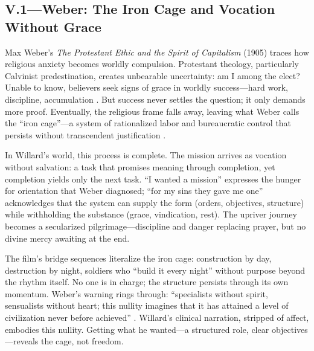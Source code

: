 \subsection*{V.1—Weber: The Iron Cage and Vocation Without Grace}
\label{ssec:v-weber}
Max Weber's \textit{The Protestant Ethic and the Spirit of Capitalism} (1905) traces how 
religious anxiety becomes worldly compulsion. Protestant theology, particularly Calvinist 
predestination, creates unbearable uncertainty: am I among the elect? Unable to know, believers 
seek signs of grace in worldly success---hard work, discipline, accumulation 
\parencite{WeberProtestant2002}. But success never settles the question; it only demands more 
proof. Eventually, the religious frame falls away, leaving what Weber calls the ``iron 
cage''---a system of rationalized labor and bureaucratic control that persists without 
transcendent justification \parencite{WeberProtestant2002}.

In Willard's world, this process is complete. The mission arrives as vocation without 
salvation: a task that promises meaning through completion, yet completion yields only the next 
task. ``I wanted a mission'' expresses the hunger for orientation that Weber diagnosed; ``for 
my sins they gave me one'' acknowledges that the system can supply the form (orders, 
objectives, structure) while withholding the substance (grace, vindication, rest). The upriver 
journey becomes a secularized pilgrimage---discipline and danger replacing prayer, but no 
divine mercy awaiting at the end.

The film's bridge sequences literalize the iron cage: construction by day, destruction by 
night, soldiers who ``build it every night'' without purpose beyond the rhythm itself. No one 
is in charge; the structure persists through its own momentum. Weber's warning rings through: 
``specialists without spirit, sensualists without heart; this nullity imagines that it has 
attained a level of civilization never before achieved'' \parencite{WeberProtestant2002}. 
Willard's clinical narration, stripped of affect, embodies this nullity. Getting what he 
wanted---a structured role, clear objectives---reveals the cage, not freedom.

